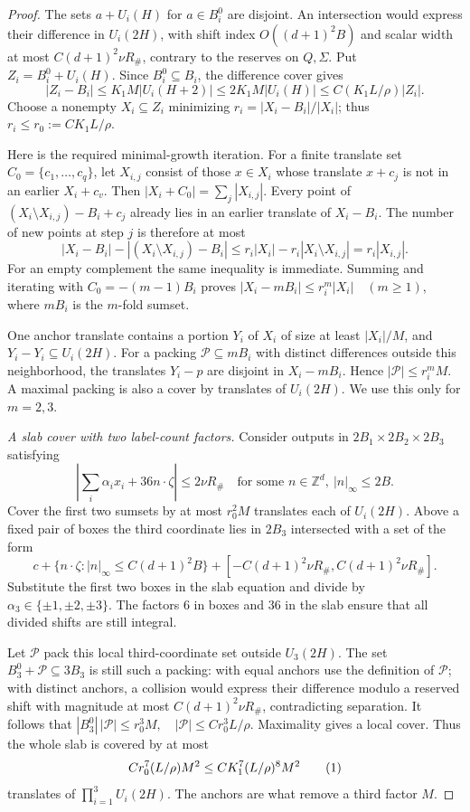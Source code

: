 \documentclass[11pt]{article}
\theoremstyle{definition}
\newcommand{\Z}{\mathbb Z}
\newcommand{\eqtag}[1]{\refstepcounter{equation}\tag{\theequation}\label{#1}}
\numberwithin{equation}{section}
\begin{document}
\begin{proof}
The sets $a+U_i(H)$ for $a\in B_i^0$ are disjoint. An intersection would express their difference in $U_i(2H)$, with shift index $O((d+1)^2B)$ and scalar width at most $C(d+1)^2\nu R_\#$, contrary to the reserves on $Q,\Sigma$. Put $Z_i=B_i^0+U_i(H)$. Since $B_i^0\subseteq B_i$, the difference cover gives
\[
 |Z_i-B_i|\le K_1M|U_i(H+2)|\le2K_1M|U_i(H)|
 \le C(K_1L/\rho)|Z_i|.
\]
Choose a nonempty $X_i\subseteq Z_i$ minimizing $r_i=|X_i-B_i|/|X_i|$; thus $r_i\le r_0:=CK_1L/\rho$.

Here is the required minimal-growth iteration. For a finite translate set $C_0=\{c_1,\ldots,c_q\}$, let $X_{i,j}$ consist of those $x\in X_i$ whose translate $x+c_j$ is not in an earlier $X_i+c_v$. Then $|X_i+C_0|=\sum_j|X_{i,j}|$. Every point of $(X_i\setminus X_{i,j})-B_i+c_j$ already lies in an earlier translate of $X_i-B_i$. The number of new points at step $j$ is therefore at most
\[
 |X_i-B_i|-|(X_i\setminus X_{i,j})-B_i|
 \le r_i|X_i|-r_i|X_i\setminus X_{i,j}|=r_i|X_{i,j}|.
\]
For an empty complement the same inequality is immediate. Summing and iterating with $C_0=-(m-1)B_i$ proves $|X_i-mB_i|\le r_i^m|X_i|\quad(m\ge1)$, where $mB_i$ is the $m$-fold sumset.

One anchor translate contains a portion $Y_i$ of $X_i$ of size at least $|X_i|/M$, and $Y_i-Y_i\subseteq U_i(2H)$. For a packing $\mathcal P\subseteq mB_i$ with distinct differences outside this neighborhood, the translates $Y_i-p$ are disjoint in $X_i-mB_i$. Hence $|\mathcal P|\le r_i^mM$. A maximal packing is also a cover by translates of $U_i(2H)$. We use this only for $m=2,3$.

\emph{A slab cover with two label-count factors.} Consider outputs in $2B_1\times2B_2\times2B_3$ satisfying
\[
 \left|\sum_i\alpha_i x_i+36n\cdot\zeta\right|\le2\nu R_\#
 \quad\text{for some }n\in\Z^d,\ |n|_\infty\le2B.
\]
Cover the first two sumsets by at most $r_0^2M$ translates each of $U_i(2H)$. Above a fixed pair of boxes the third coordinate lies in $2B_3$ intersected with a set of the form
\[
 c+\{n\cdot\zeta:|n|_\infty\le C(d+1)^2B\}
 +[-C(d+1)^2\nu R_\#,C(d+1)^2\nu R_\#].
\]
Substitute the first two boxes in the slab equation and divide by $\alpha_3\in\{\pm1,\pm2,\pm3\}$. The factors $6$ in boxes and $36$ in the slab ensure that all divided shifts are still integral.

Let $\mathcal P$ pack this local third-coordinate set outside $U_3(2H)$. The set $B_3^0+\mathcal P\subseteq3B_3$ is still such a packing: with equal anchors use the definition of $\mathcal P$; with distinct anchors, a collision would express their difference modulo a reserved shift with magnitude at most $C(d+1)^2\nu R_\#$, contradicting separation. It follows that $|B_3^0|\,|\mathcal P|\le r_0^3M,\quad |\mathcal P|\le Cr_0^3L/\rho$. Maximality gives a local cover. Thus the whole slab is covered by at most
\[
 Cr_0^7(L/\rho)M^2\le CK_1^7(L/\rho)^8M^2
 \eqtag{eq:slab-cover}
\]
translates of $\prod_{i=1}^3U_i(2H)$. The anchors are what remove a third factor $M$.


\end{proof}
\end{document}
